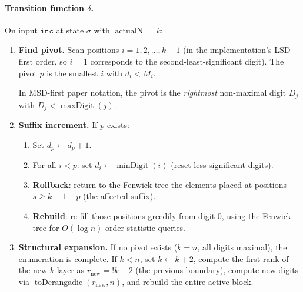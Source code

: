 \documentclass[11pt,a4paper]{article}
\newcommand{\subfact}[1]{!{#1}} %
\newcommand{\actualN}{\operatorname{actualN}}
\newcommand{\maxd}[1]{\operatorname{maxDigit}(#1)}
\newcommand{\mind}[1]{\operatorname{minDigit}(#1)}
\begin{document}
    \paragraph{Transition function $\delta$.}
    On input $\texttt{inc}$ at state $\sigma$ with $\actualN = k$:
    \begin{enumerate}
        \item \textbf{Find pivot.} Scan positions $i = 1, 2, \dots, k-1$
        (in the implementation's LSD-first order, so $i=1$ corresponds to
        the second-least-significant digit). The pivot $p$ is the smallest
        $i$ with $d_i < M_i$.

        In MSD-first paper notation, the pivot is the \emph{rightmost}
        non-maximal digit $D_j$ with $D_j < \maxd{j}$.

        \item \textbf{Suffix increment.} If $p$ exists:
        \begin{enumerate}
            \item Set $d_p \leftarrow d_p + 1$.
            \item For all $i < p$: set $d_i \leftarrow \mind{i}$ (reset less-significant digits).
            \item \textbf{Rollback}: return to the Fenwick tree the elements placed
            at positions $s \geq k-1-p$ (the affected suffix).
            \item \textbf{Rebuild}: re-fill those positions greedily from digit 0,
            using the Fenwick tree for $O(\log n)$ order-statistic queries.
        \end{enumerate}

        \item \textbf{Structural expansion.} If no pivot exists ($k = n$, all
        digits maximal), the enumeration is complete. If $k < n$, set
        $k \leftarrow k+2$, compute the first rank of the new $k$-layer as
        $r_{\text{new}} = \subfact{k-2}$ (the previous boundary), compute new
        digits via $\operatorname{toDerangadic}(r_{\text{new}}, n)$, and rebuild
        the entire active block.
    \end{enumerate}
\end{document}
